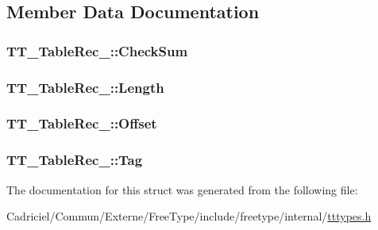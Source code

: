 \subsection{Member Data Documentation}
\hypertarget{struct_t_t___table_rec___aacf9207fae3522bb65359c2288900fca}{
\subsubsection[{Check\-Sum}]{ T\-T\-\_\-\-Table\-Rec\-\_\-\-::\-Check\-Sum}}\label{struct_t_t___table_rec___aacf9207fae3522bb65359c2288900fca}
\hypertarget{struct_t_t___table_rec___aa0d3a1f4491bf4418bc26241bdd7d21b}{
\subsubsection[{Length}]{ T\-T\-\_\-\-Table\-Rec\-\_\-\-::\-Length}}\label{struct_t_t___table_rec___aa0d3a1f4491bf4418bc26241bdd7d21b}
\hypertarget{struct_t_t___table_rec___a91840e1cee040f8da6a34a081dda17b6}{
\subsubsection[{Offset}]{ T\-T\-\_\-\-Table\-Rec\-\_\-\-::\-Offset}}\label{struct_t_t___table_rec___a91840e1cee040f8da6a34a081dda17b6}
\hypertarget{struct_t_t___table_rec___aaccaf9e9d3421fc37fa6e51875534995}{
\subsubsection[{Tag}]{ T\-T\-\_\-\-Table\-Rec\-\_\-\-::\-Tag}}\label{struct_t_t___table_rec___aaccaf9e9d3421fc37fa6e51875534995}


The documentation for this struct was generated from the following file\-:\begin{DoxyCompactItemize}
\item 
Cadriciel/\-Commun/\-Externe/\-Free\-Type/include/freetype/internal/\hyperlink{tttypes_8h}{tttypes.\-h}\end{DoxyCompactItemize}
